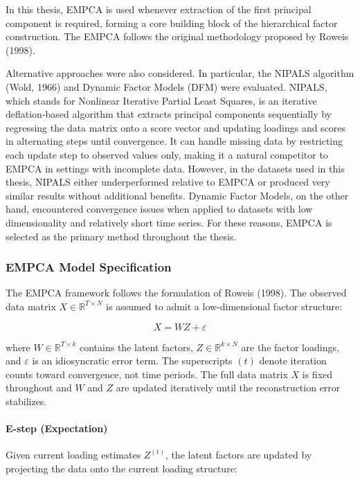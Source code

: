 \documentclass[12pt,a4paper]{report}\usepackage[a4paper, top=2.5cm, bottom=2.5cm, left=2.5cm, right=2.5cm]{geometry}
\begin{document}
In this thesis, EMPCA is used whenever extraction of the first principal component is required, forming a core building block of the hierarchical factor construction. The EMPCA follows the original methodology proposed by Roweis (1998).

Alternative approaches were also considered. In particular, the NIPALS algorithm (Wold, 1966) and Dynamic Factor Models (DFM) were evaluated. NIPALS, which stands for Nonlinear Iterative Partial Least Squares, is an iterative deflation-based algorithm that extracts principal components sequentially by regressing the data matrix onto a score vector and updating loadings and scores in alternating steps until convergence. It can handle missing data by restricting each update step to observed values only, making it a natural competitor to EMPCA in settings with incomplete data. However, in the datasets used in this thesis, NIPALS either underperformed relative to EMPCA or produced very similar results without additional benefits. Dynamic Factor Models, on the other hand, encountered convergence issues when applied to datasets with low dimensionality and relatively short time series. For these reasons, EMPCA is selected as the primary method throughout the thesis.


\subsubsection*{EMPCA Model Specification}

The EMPCA framework follows the formulation of Roweis (1998). The observed 
data matrix $X \in \mathbb{R}^{T \times N}$ is assumed to admit a 
low-dimensional factor structure:

\begin{equation}
X = WZ + \varepsilon
\end{equation}

where $W \in \mathbb{R}^{T \times k}$ contains the latent factors, 
$Z \in \mathbb{R}^{k \times N}$ are the factor loadings, and $\varepsilon$ 
is an idiosyncratic error term. The superscripts $(t)$ denote iteration 
counts toward convergence, not time periods. The full data matrix $X$ is 
fixed throughout and $W$ and $Z$ are updated iteratively until the 
reconstruction error stabilizes.

\paragraph{E-step (Expectation)}
Given current loading estimates $Z^{(t)}$, the latent factors are updated by 
projecting the data onto the current loading structure:
\end{document}
